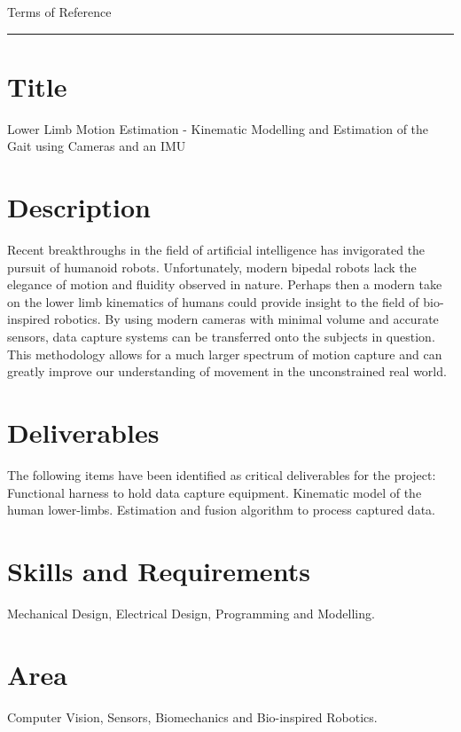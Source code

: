 \pagestyle{plain}


{\Large Terms of Reference}\\
\hrule
\vskip 5mm

\section*{Title}
Lower Limb Motion Estimation - Kinematic Modelling and Estimation of the Gait using Cameras and an IMU
\vskip -3mm

\section*{Description}
Recent breakthroughs in the field of artificial intelligence has invigorated the pursuit of humanoid robots. Unfortunately, modern bipedal robots lack the elegance of motion and fluidity observed in nature. Perhaps then a modern take on the lower limb kinematics of humans could provide insight to the field of bio-inspired robotics. By using modern cameras with minimal volume and accurate sensors, data capture systems can be transferred onto the subjects in question. This methodology allows for a much larger spectrum of motion capture and can greatly improve our understanding of movement in the unconstrained real world.

\section*{Deliverables}
The following items have been identified as critical deliverables for the project: Functional harness to hold data capture equipment. Kinematic model of the human lower-limbs. Estimation and fusion algorithm to process captured data. 
 
\section*{Skills and Requirements}
Mechanical Design, Electrical Design, Programming and Modelling.

\section*{Area}  
Computer Vision, Sensors, Biomechanics and Bio-inspired Robotics.

